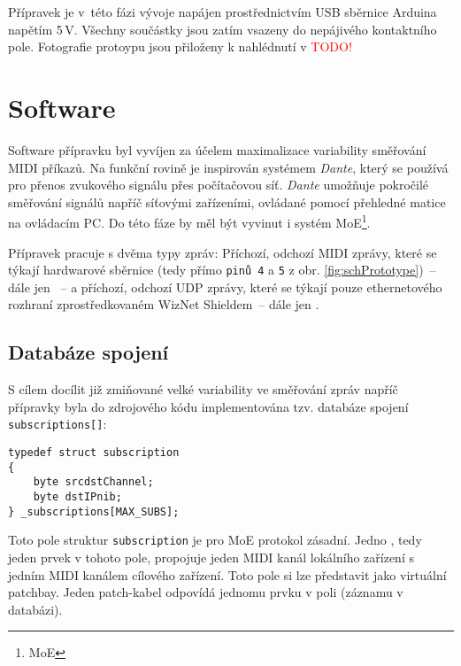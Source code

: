 Přípravek je v~této fázi vývoje napájen prostřednictvím \acs{USB} sběrnice Arduina napětím 5\,\unit{V}. Všechny součástky jsou zatím vsazeny do nepájivého kontaktního pole. Fotografie protoypu jsou přiloženy k nahlédnutí v \textcolor{red}{TODO!}


\section{Software}
Software přípravku byl vyvíjen za účelem maximalizace variability směřování \acs{MIDI} příkazů. Na funkční rovině je inspirován systémem \emph{Dante}, který se používá pro přenos zvukového signálu přes počítačovou síť. \emph{Dante} umožňuje pokročilé směřování signálů napříč síťovými zařízeními, ovládané pomocí přehledné matice na ovládacím PC. Do této fáze by měl být vyvinut i systém \acs{MoE}\footnote{\acl{MoE}}.

Přípravek pracuje s dvěma typy zpráv: Příchozí, odchozí \acs{MIDI} zprávy, které se týkají hardwarové sběrnice (tedy přímo \texttt{pinů 4} a \texttt{5} z obr. \ref{fig:schPrototype})~-- dále jen ~-- a příchozí, odchozí UDP zprávy, které se týkají pouze ethernetového rozhraní zprostředkovaném WizNet Shieldem~-- dále jen .
\subsection{Databáze spojení}\label{chpt:DatSpoj}
S cílem docílit již zmiňované velké variability ve směřování zpráv napříč přípravky byla do zdrojového kódu implementována tzv. databáze spojení \texttt{sub\-scrip\-tions[]}:
\begin{lstlisting}
typedef struct subscription
{
    byte srcdstChannel;
    byte dstIPnib;
} _subscriptions[MAX_SUBS];
\end{lstlisting}
Toto pole struktur \texttt{subscription} je pro \acs{MoE} protokol zásadní. Jedno , tedy jeden prvek v tohoto pole, propojuje jeden \acs{MIDI} kanál lokálního zařízení s jedním \acs{MIDI} kanálem cílového zařízení. Toto pole si lze představit jako virtuální patchbay. Jeden patch-kabel odpovídá jednomu prvku v poli (záznamu v databázi). 

